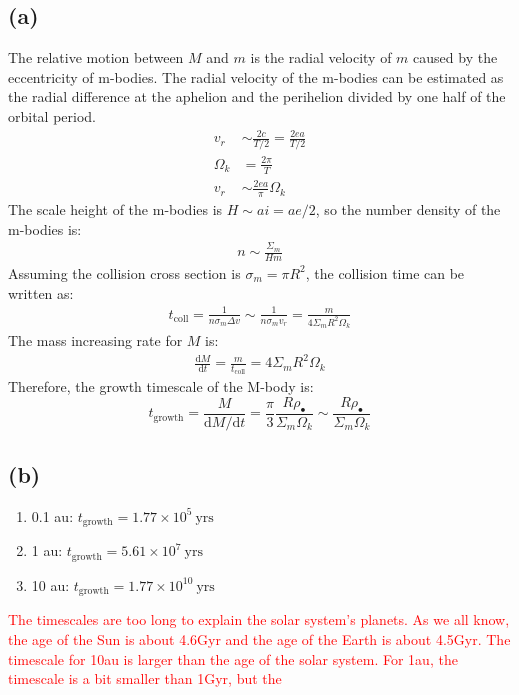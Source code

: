 \documentclass[a4paper,12pt]{article}
\renewcommand{\d}{\mathrm{d}}
\begin{document}
\subsection*{(a)}
The relative motion between $M$ and $m$ is the radial velocity of $m$ caused by the eccentricity of m-bodies.
The radial velocity of the m-bodies can be estimated as the radial difference at the aphelion and the  perihelion 
divided by one half of the orbital period.
\begin{align*}
    v_r &\sim  \frac{2c}{T/2} = \frac{2ea}{T/2} \\
    \Omega_k &= \frac{2\pi}{T} \\
    v_r &\sim \frac{2ea}{\pi } \Omega_k
\end{align*}
The scale height of the m-bodies is $H \sim ai = ae/2$, so the number density of the m-bodies is:
\begin{align*}
    n \sim \frac{\Sigma_m}{H m}
\end{align*}
Assuming the collision cross section is $\sigma_m = \pi R^2$, the collision time can be written as:
\begin{align*}
    t_\text{coll} = \frac{1}{n\sigma_m \Delta v} \sim \frac{1}{n\sigma_m v_r} = \frac{m}{4\Sigma_m R^2 \Omega_k}
\end{align*}
The mass increasing rate for $M$ is:
\begin{align*}
    \frac{\d M}{\d t} = \frac{m}{t_\text{coll}} = 4 \Sigma_m R^2 \Omega_k
\end{align*}
Therefore, the growth timescale of the M-body is:
\begin{equation*}
    t_\text{growth} = \frac{M}{\d M/\d t} = \frac{\pi}{3} \frac{R \rho_\bullet }{\Sigma_m \Omega_k} \sim \frac{R \rho_\bullet }{\Sigma_m \Omega_k}
\end{equation*}

\subsection*{(b)}
\begin{enumerate}
    \item[] 0.1 au: $t_\text{growth} = 1.77 \times 10^5 \ \text{yrs}$
    \item[] 1 au: $t_\text{growth} = 5.61 \times 10^7 \ \text{yrs}$ 
    \item[] 10 au: $t_\text{growth} = 1.77 \times 10^{10} \ \text{yrs}$ 
\end{enumerate}
\textcolor{red}{The timescales are too long to explain the solar system's planets. As we all know, 
the age of the Sun is about 4.6Gyr and the age of the Earth is about 4.5Gyr. 
The timescale for 10au is larger than the age of the solar system.
For 1au, the timescale is a bit smaller than 1Gyr, but the }
\end{document}
